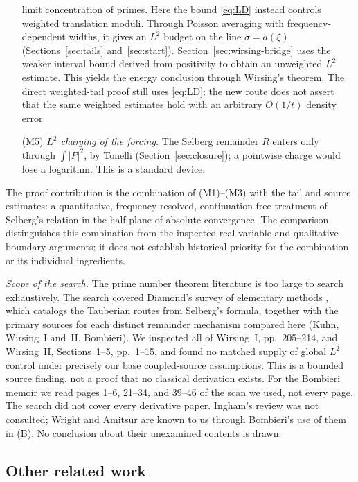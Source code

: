 \documentclass[11pt,letterpaper]{article}
\numberwithin{equation}{section}
\theoremstyle{definition}
\theoremstyle{remark}
\begin{document}
\begin{enumerate}
       limit concentration of primes. Here the bound \eqref{eq:LD} instead
       controls weighted translation moduli. Through Poisson averaging with
       frequency-dependent widths, it gives an $L^2$ budget on the line
       $\sigma=a(\xi)$ (Sections~\ref{sec:tails} and~\ref{sec:start}).
       Section~\ref{sec:wirsing-bridge} uses the weaker interval bound
       derived from positivity to obtain an unweighted $L^2$ estimate.
       This yields the energy conclusion through Wirsing's theorem.
       The direct weighted-tail proof still uses \eqref{eq:LD}; the new
       route does not assert that the same weighted estimates hold with
       an arbitrary $O(1/t)$ density error.
 \item[(M5)] \emph{$L^2$ charging of the forcing.} The Selberg remainder
       $R$ enters only through $\int|P|^2$, by Tonelli
       (Section~\ref{sec:closure}); a pointwise charge would lose a
       logarithm. This is a standard device.
\end{enumerate}

The proof contribution is the combination of (M1)--(M3) with
the tail and source estimates: a quantitative, frequency-resolved,
continuation-free treatment of Selberg's relation in the half-plane of
absolute convergence. The comparison distinguishes this combination
from the inspected real-variable and qualitative boundary arguments;
it does not establish historical priority for the combination or its
individual ingredients.

\emph{Scope of the search.} The prime number theorem literature is too large
to search exhaustively. The search covered Diamond's survey of elementary
methods \cite{diamond-survey}, which catalogs the Tauberian routes from
Selberg's formula, together with the primary sources for each distinct
remainder mechanism compared here (Kuhn, Wirsing~I and~II, Bombieri).
We inspected all of Wirsing~I, pp.~205--214, and
Wirsing~II, Sections~1--5, pp.~1--15, and found no matched supply of global
$L^2$ control under precisely our base coupled-source assumptions.
This is a bounded source finding, not a proof that no classical derivation
exists. For the Bombieri memoir we read pages 1--6, 21--34, and 39--46
of the scan we used, not every page. The search did not cover
every derivative paper. Ingham's review \cite{ingham} was not consulted;
Wright \cite{wright} and Amitsur \cite{amitsur} are known to us through
Bombieri's use of them in (B). No conclusion about their unexamined
contents is drawn.

\subsection{Other related work}
\end{document}
